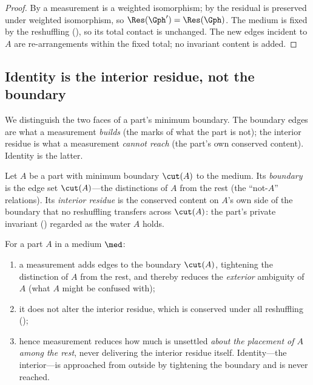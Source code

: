 \begin{proof}
By  a measurement is a weighted isomorphism; by
 the residual is preserved under weighted
isomorphism, so $\Res(\Gph')=\Res(\Gph)$. The medium is fixed by the reshuffling
(), so its total contact is unchanged. The new edges incident
to $A$ are re-arrangements within the fixed total; no invariant content is added.
\end{proof}

\subsection{Identity is the interior residue, not the boundary}

We distinguish the two faces of a part's minimum boundary. The boundary edges are
what a measurement \emph{builds} (the marks of what the part is not); the interior
residue is what a measurement \emph{cannot reach} (the part's own conserved
content). Identity is the latter.

\begin{definition}
\label{def:interior}
Let $A$ be a part with minimum boundary $\cut(A)$ to the medium. Its
\emph{boundary} is the edge set $\cut(A)$---the distinctions of $A$ from the rest
\textup{(}the ``not-$A$'' relations\textup{)}. Its \emph{interior residue} is the
conserved content on $A$'s own side of the boundary that no reshuffling
transfers across $\cut(A)$: the part's private invariant
\textup{(}\textup{)} regarded as the water $A$ holds.
\end{definition}

\begin{theorem}
\label{thm:identity-interior}
For a part $A$ in a medium $\med$:
\begin{enumerate}[label=\textup{(\roman*)},leftmargin=2.2em]
\item a measurement adds edges to the boundary $\cut(A)$, tightening the
distinction of $A$ from the rest, and thereby reduces the \emph{exterior}
ambiguity of $A$ \textup{(}what $A$ might be confused with\textup{)};
\item it does not alter the interior residue, which is conserved under all
reshuffling \textup{(}\textup{)};
\item hence measurement reduces how much is unsettled \emph{about the placement of
$A$ among the rest}, never delivering the interior residue itself. Identity---the
interior---is approached from outside by tightening the boundary and is never
reached.
\end{enumerate}
\end{theorem}

